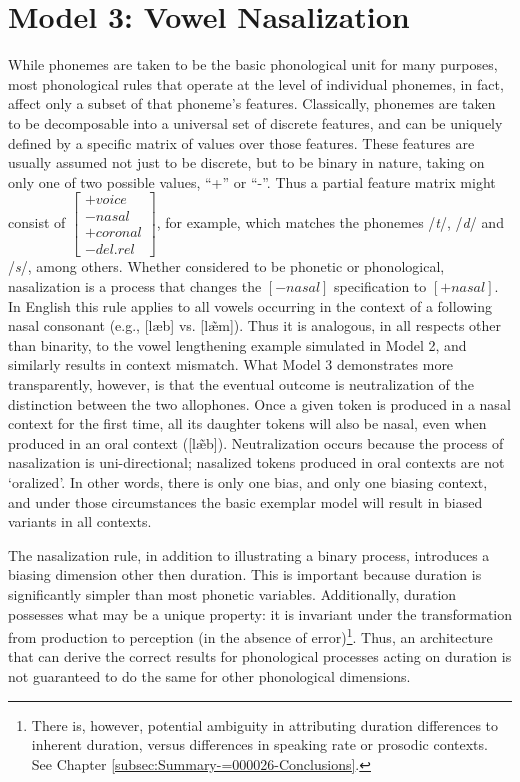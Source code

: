 \section{\label{subsec:Model-3:-Nasalization}Model 3: Vowel Nasalization}

While phonemes are taken to be the basic phonological unit for many
purposes, most phonological rules that operate at the level of individual
phonemes, in fact, affect only a subset of that phoneme's features.
Classically, phonemes are taken to be decomposable into a universal
set of discrete features, and can be uniquely defined by a specific
matrix of values over those features. These features are usually assumed
not just to be discrete, but to be binary in nature, taking on only
one of two possible values, “+” or “-”. Thus a partial
feature matrix might consist of $\left[\begin{array}{c}
+voice\\
-nasal\\
+coronal\\
-del.rel
\end{array}\right]$, for example, which matches the phonemes /\emph{t}/, /\emph{d}/\emph{
}and /\emph{s}/, among others. Whether considered to be phonetic or
phonological, nasalization is a process that changes the $\left[-nasal\right]$
specification to $\left[+nasal\right]$. In English this rule applies
to all vowels occurring in the context of a following nasal consonant
(e.g., {[læb]} vs. {[læ̃m]}). Thus it is analogous,
in all respects other than binarity, to the vowel lengthening example
simulated in Model 2, and similarly results in context mismatch. What
Model 3 demonstrates more transparently, however, is that the eventual
outcome is neutralization of the distinction between the two allophones.
Once a given token is produced in a nasal context for the first time,
all its daughter tokens will also be nasal, even when produced in
an oral context ({[læ̃b]}). Neutralization occurs because
the process of nasalization is uni-directional; nasalized tokens produced
in oral contexts are not `oralized'. In other words, there is only
one bias, and only one biasing context, and under those circumstances
the basic exemplar model will result in biased variants in all contexts.

The nasalization rule, in addition to illustrating a binary process,
introduces a biasing dimension other then duration. This is important
because duration is significantly simpler than most phonetic variables.
Additionally, duration possesses what may be a unique property: it
is invariant under the transformation from production to perception
(in the absence of error)\footnote{There is, however, potential ambiguity in attributing duration differences
to inherent duration, versus differences in speaking rate or prosodic
contexts. See Chapter \ref{subsec:Summary-=000026-Conclusions}. }. Thus, an architecture that can derive the correct results for phonological
processes acting on duration is not guaranteed to do the same for
other phonological dimensions. 

